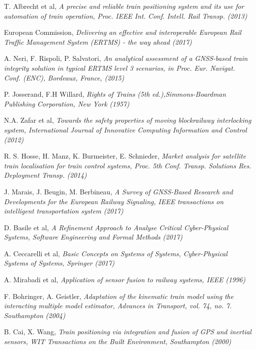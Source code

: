 \begin{thebibliography}{9}
T. Albrecht et al, \textit{A precise and reliable train positioning system and its use for automation of train
operation, Proc. IEEE Int. Conf. Intell. Rail Transp. (2013)}

European Commission, \textit{
	Delivering an effective and interoperable European Rail Traffic Management System
	(ERTMS) - the way ahead (2017)}

A. Neri, F. Rispoli, P. Salvatori, \textit{An analytical assessment of
a GNSS-based train integrity solution in typical ERTMS level 3
scenarios, in Proc. Eur. Navigat. Conf. (ENC), Bordeaux, France, (2015)}

 P. Josserand, F.H Willard, \textit{Rights of Trains (5th ed.),Simmons-Boardman Publishing Corporation, New York (1957)}
 
N.A. Zafar et al, \textit{Towards the safety properties of moving blockrailway interlocking system, International Journal of Innovative Computing Information and Control (2012)}

R. S. Hosse, H. Manz, K. Burmeister, E. Schnieder, \textit{Market
analysis for satellite train localisation for train control systems,
Proc. 5th Conf. Transp. Solutions Res. Deployment Transp. (2014)}

J. Marais, J. Beugin, M. Berbineau, \textit{A Survey of GNSS-Based Research and
	Developments for the European Railway Signaling, IEEE transactions on intelligent transportation system (2017)}

D. Basile et al, \textit{A Refinement Approach to Analyse Critical Cyber-Physical Systems,
Software Engineering and Formal Methods  (2017)}

A. Ceccarelli et al, \emph{Basic Concepts on Systems of Systems, Cyber-Physical Systems of Systems, Springer (2017)}


A. Mirabadi et al, \textit{Application of sensor fusion to railway systems, IEEE (1996)}

F. Bohringer, A. Geistler, \textit{Adaptation of the kinematic train
	model using the interacting multiple model estimator, Advances in
	Transport, vol. 74, no. 7. Southampton (2004)}

B. Cai, X. Wang, \textit{Train positioning via integration and
fusion of GPS and inertial sensors, WIT Transactions on the Built Environment, Southampton (2000)}


\end{thebibliography}
